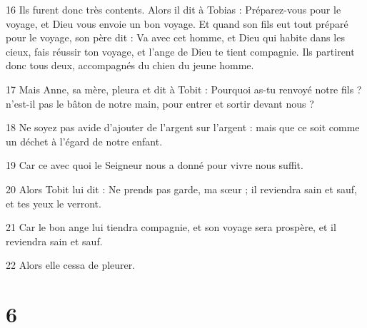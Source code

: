 \par 16 Ils furent donc très contents. Alors il dit à Tobias : Préparez-vous pour le voyage, et Dieu vous envoie un bon voyage. Et quand son fils eut tout préparé pour le voyage, son père dit : Va avec cet homme, et Dieu qui habite dans les cieux, fais réussir ton voyage, et l'ange de Dieu te tient compagnie. Ils partirent donc tous deux, accompagnés du chien du jeune homme.
\par 17 Mais Anne, sa mère, pleura et dit à Tobit : Pourquoi as-tu renvoyé notre fils ? n'est-il pas le bâton de notre main, pour entrer et sortir devant nous ?
\par 18 Ne soyez pas avide d'ajouter de l'argent sur l'argent : mais que ce soit comme un déchet à l'égard de notre enfant.
\par 19 Car ce avec quoi le Seigneur nous a donné pour vivre nous suffit.
\par 20 Alors Tobit lui dit : Ne prends pas garde, ma sœur ; il reviendra sain et sauf, et tes yeux le verront.
\par 21 Car le bon ange lui tiendra compagnie, et son voyage sera prospère, et il reviendra sain et sauf.
\par 22 Alors elle cessa de pleurer.

\chapter{6}

